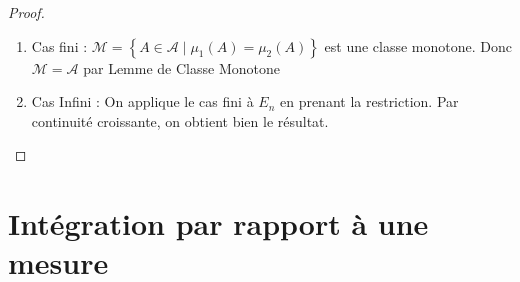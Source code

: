 \documentclass{cours}
\begin{document}
    \begin{proof}
        \begin{enumerate}
            \item Cas fini : $\mathcal{M} = \left\{A \in \mathcal{A} \mid \mu_{1}(A) = \mu_{2}(A)\right\}$ est une classe monotone. Donc $\mathcal{M} = \mathcal{A}$ par Lemme de Classe Monotone
            \item Cas Infini : On applique le cas fini à $E_{n}$ en prenant la restriction. Par continuité croissante, on obtient bien le résultat. 
        \end{enumerate}
    \end{proof}
    
\section{Intégration par rapport à une mesure}
\end{document}
